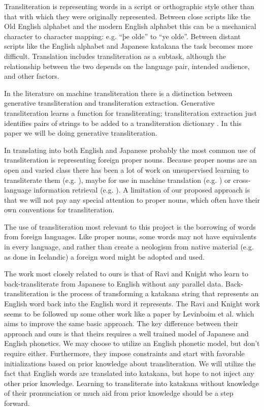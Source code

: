 \documentclass{article}
\begin{document}
Transliteration is representing words
in a script or orthographic style
other than that with which they were originally represented.
Between close scripts like the Old English alphabet and the modern English alphabet
this can be a mechanical character to character mapping:
e.g. ``þe olde'' to ``ye olde''.
Between distant scripts
like the English alphabet and Japanese katakana
the task becomes more difficult.
Translation includes transliteration as a subtask,
although the relationship between the two
depends on the language pair, intended audience, and other factors.

In the literature on machine transliteration there is a distinction
between generative transliteration and transliteration extraction.
Generative transliteration learns a function for transliterating;
transliteration extraction just identifies pairs of strings
to be added to a transliteration dictionary
\cite{Karimi:2011:MTS:1922649.1922654}.
In this paper we will be doing generative transliteration.

In translating into both English and Japanese
probably the most common use of transliteration
is representing foreign proper nouns.
Because proper nouns are an open and varied class
there has been a lot of work on unsupervised learning to transliterate them
(e.g. \cite{Tao2006UnsupervisedNE}),
maybe for use in machine translation (e.g. \cite{Durrani2014IntegratingAU})
or cross-language information retrieval (e.g. \cite{10.1007/978-3-642-40087-2_29}).
A limitation of our proposed approach
is that we will not pay any special attention to proper nouns,
which often have their own conventions for transliteration.

The use of transliteration most relevant to this project
is the borrowing of words from foreign languages.
Like proper nouns,
some words may not have equivalents in every language,
and rather than create a neologism from native material (e.g. as done in Icelandic)
a foreign word might be adopted and used.

The work most closely related to ours is that of Ravi and Knight
\cite{Ravi2009LearningPM}
who learn to back-transliterate from Japanese to English
without any parallel data.
Back-transliteration is the process of
transforming a katakana string that represents an English word
back into the English word it represents.
The Ravi and Knight work seems to be followed up some other work
like a paper by Levinboim et al. \cite{Levinboim2015ModelIR}
which aims to improve the same basic approach.
The key difference between their approach and ours
is that theirs requires a well trained model of Japanese and English phonetics.
We may choose to utilize an English phonetic model,
but don't require either.
Furthermore,
they impose constraints and start with favorable initializations
based on prior knowledge about transliteration.
We will utilize the fact
that English words are translated into katakana,
but hope to not inject any other prior knowledge.
Learning to transliterate into katakana
without knowledge of their pronunciation
or much aid from prior knowledge should be a step forward.
\end{document}
